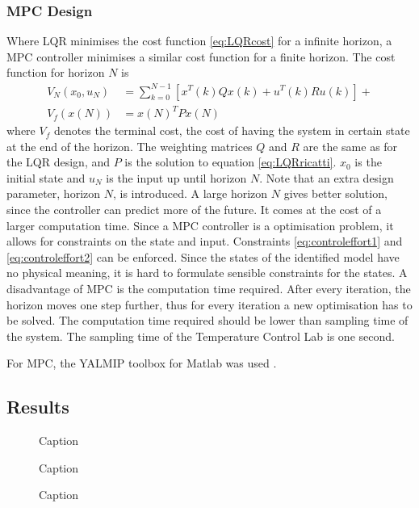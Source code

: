 \subsubsection{MPC Design}
Where LQR minimises the cost function \ref{eq:LQRcost} for a infinite horizon, a MPC controller minimises a similar cost function for a finite horizon. The cost function for horizon $N$ is
\begin{align}
    V_N(x_0,u_N) &= \sum_{k=0}^{N-1}[x^T(k)Qx(k) + u^T(k)Ru(k)] +  \label{eq:MPCcost}\\
    V_f(x(N)) &= x(N)^TPx(N) \nonumber
\end{align}
where $V_f$ denotes the terminal cost, the cost of having the system in certain state at the end of the horizon. The weighting matrices $Q$ and $R$ are the same as for the LQR design, and $P$ is the solution to equation \ref{eq:LQRricatti}. $x_0$ is the initial state and $u_N$ is the input up until horizon $N$. Note that an extra design parameter, horizon $N$, is introduced. A large horizon $N$ gives better solution, since the controller can predict more of the future. It comes at the cost of a larger computation time.
Since a MPC controller is a optimisation problem, it allows for constraints on the state and input. Constraints \ref{eq:controleffort1} and \ref{eq:controleffort2} can be enforced. Since the states of the identified model have no physical meaning, it is hard to formulate sensible constraints for the states.
A disadvantage of MPC is the computation time required. After every iteration, the horizon moves one step further, thus for every iteration a new optimisation has to be solved. The computation time required should be lower than sampling time of the system. The sampling time of the Temperature Control Lab is one second.

For MPC, the YALMIP toolbox for Matlab was used \cite{Lofberg2004}.

\subsection{Results}

\begin{figure}
    \centering
    
    \caption{Caption}
    \label{fig:my_label}
\end{figure}

\begin{figure}
    \centering
    
    \caption{Caption}
    \label{fig:my_label}
\end{figure}

\begin{figure}
    \centering
    
    \caption{Caption}
    \label{fig:my_label}
\end{figure}
